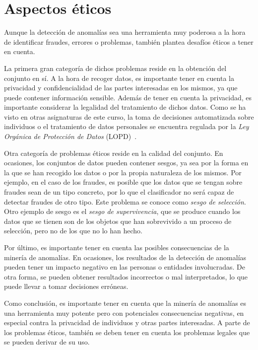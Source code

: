 \section{Aspectos éticos}\label{sec:etica}
Aunque la detección de anomalías sea una herramienta muy poderosa a la hora de identificar
fraudes, errores o problemas, también plantea desafíos éticos a tener en cuenta.

La primera gran categoría de dichos problemas reside en la obtención del conjunto en sí.
A la hora de recoger datos, es importante tener en cuenta la privacidad y confidencialidad
de las partes interesadas en los mismos, ya que puede contener información sensible. Además
de tener en cuenta la privacidad, es importante considerar la legalidad del tratamiento de
dichos datos. Como se ha visto en otras asignaturas de este curso, la toma de decisiones
automatizada sobre individuos o el tratamiento de datos personales se encuentra regulada
por la \textit{Ley Orgánica de Protección de Datos} (LOPD)~\cite{lopd}.

Otra categoría de problemas éticos reside en la calidad del conjunto. En ocasiones, los
conjuntos de datos pueden contener sesgos, ya sea por la forma en la que se han recogido
los datos o por la propia naturaleza de los mismos. Por ejemplo, en el caso de los fraudes,
es posible que los datos que se tengan sobre fraudes sean de un tipo concreto, por lo que
el clasificador no será capaz de detectar fraudes de otro tipo. Este problema se conoce
como \textit{sesgo de selección}. Otro ejemplo de sesgo es el \textit{sesgo de supervivencia},
que se produce cuando los datos que se tienen son de los objetos que han sobrevivido a un
proceso de selección, pero no de los que no lo han hecho.

Por último, es importante tener en cuenta las posibles consecuencias de la minería de
anomalías. En ocasiones, los resultados de la detección de anomalías pueden tener un
impacto negativo en las personas o entidades involucradas. De otra forma, se pueden
obtener resultados incorrectos o mal interpretados, lo que puede llevar a tomar decisiones
erróneas.

Como conclusión, es importante tener en cuenta que la minería de anomalías es una herramienta
muy potente pero con potenciales consecuencias negativas, en especial contra la privacidad
de individuos y otras partes interesadas. A parte de los problemas éticos, también se deben
tener en cuenta los problemas legales que se pueden derivar de su uso.
